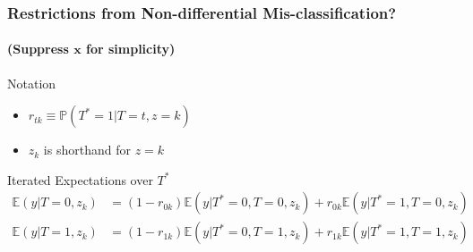\documentclass[handout]{beamer}
\begin{document}
\begin{frame}[plain, c]
\end{frame}
%
%
%
%
\begin{frame}[t]
  \frametitle{Restrictions from Non-differential Mis-classification?}
  \framesubtitle{(Suppress $\mathbf{x}$ for simplicity)}

  \footnotesize

  \begin{block}{Notation}
    \begin{itemize}
      \item $r_{tk} \equiv \mathbb{P}(T^*=1|T=t,z=k)$
      \item $z_k$ is shorthand for $z =k$\\
    \end{itemize}
  \end{block}

  \begin{block}{Iterated Expectations over $T^*$}
    \vspace{-1em}
  \begin{align*}
    \mathbb{E}(y|T=0,z_k) &= (1 - r_{0k})\mathbb{E}(y|T^*=0,T=0,z_k) + r_{0k}\mathbb{E}(y|T^*=1,T=0,z_k)\\
    \mathbb{E}(y|T=1,z_k) &= (1 - r_{1k}) \mathbb{E}(y|T^*=0,T=1,z_k) + r_{1k}\mathbb{E}(y|T^*=1,T=1,z_k)
  \end{align*}
  \end{block}

\end{frame}
\end{document}
